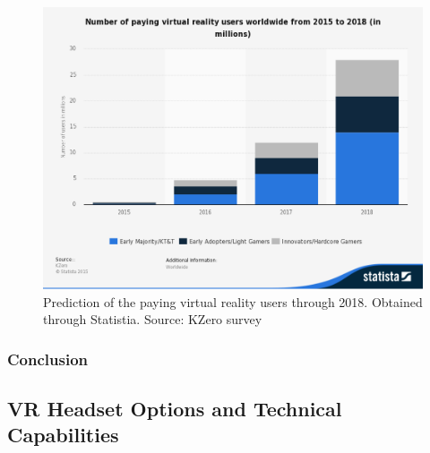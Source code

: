 \documentclass[a4paper,10pt]{article}
\begin{document}
\begin{figure}[H]
	\centerline{\includegraphics[scale = 0.25]{statPay.png}}
	\caption{Prediction of the paying virtual reality users through 2018.  Obtained through Statistia.  Source: KZero survey}
	\label{fig:moneyStats2}
\end{figure}
\subsubsection{Conclusion}
\pagebreak
\subsection{VR Headset Options and Technical Capabilities}
\label{section:headset}
\end{document}
